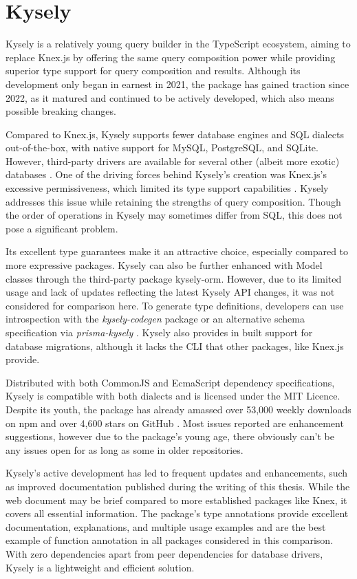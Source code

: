 \section{Kysely}
Kysely is a relatively young query builder in the TypeScript ecosystem, aiming
to replace Knex.js by offering the same query composition power while providing
superior type support for query composition and results. Although its
development only began in earnest in 2021, the package has gained traction since
2022, as it matured and continued to be actively developed, which also means
possible breaking changes.

Compared to Knex.js, Kysely supports fewer database engines and SQL dialects
out-of-the-box, with native support for MySQL, PostgreSQL, and SQLite. However,
third-party drivers are available for several other (albeit more exotic)
databases \cite{kyselyWeb}. One of the driving forces behind Kysely's creation
was Knex.js's excessive permissiveness, which limited its type support
capabilities \cite{kyselyGithub}. Kysely addresses this issue while retaining
the strengths of query composition. Though the order of operations in Kysely may
sometimes differ from SQL, this does not pose a significant problem.

Its excellent type guarantees make it an attractive choice, especially compared
to more expressive packages. Kysely can also be further enhanced with Model
classes through the third-party package kysely-orm. However, due to its limited
usage and lack of updates reflecting the latest Kysely API changes, it was not
considered for comparison here. To generate type definitions, developers can use
introspection with the \textit{kysely-codegen} package \cite{kyselyCodegen} or
an alternative schema specification via \textit{prisma-kysely}
\cite{kyselyPrisma}. Kysely also provides in built support for database
migrations, although it lacks the CLI that other packages, like Knex.js
provide.

Distributed with both CommonJS and EcmaScript dependency specifications, Kysely
is compatible with both dialects and is licensed under the MIT Licence. Despite
its youth, the package has already amassed over 53,000 weekly downloads on npm
and over 4,600 stars on GitHub \cite{kyselyGithub}. Most issues reported are
enhancement suggestions, however due to the package's young age, there obviously
can't be any issues open for as long as some in older repositories.

Kysely's active development has led to frequent updates and enhancements, such
as improved documentation published during the writing of this thesis. While the
web document may be brief compared to more established packages like Knex, it
covers all essential information. The package's type annotations provide
excellent documentation, explanations, and multiple usage examples and are the
best example of function annotation in all packages considered in this
comparison. With zero dependencies apart from peer dependencies for database
drivers, Kysely is a lightweight and efficient solution.


